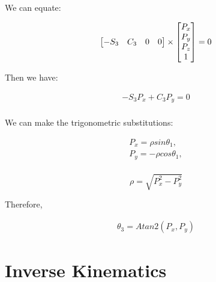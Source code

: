 \documentclass[transmag]{IEEEtran}
\begin{document}
We can equate:

\begin{equation}
\begin{bmatrix}
-S_3  & C_3   & 0 & 0   \\
\end{bmatrix}
\times
\begin{bmatrix}
P_x \\
P_y \\
P_z \\
1
\end{bmatrix}
= 0 \\
\end{equation}

Then we have:

\begin{equation}
\begin{matrix}
-S_3 P_x + C_3 P_y = 0 \\

\end{matrix}
\end{equation}

We can make the trigonometric substitutions:

\begin{equation}
\begin{matrix}
P_x = \rho sin \theta_1, \\
P_y = -\rho cos \theta_1, \\
\end{matrix}
\end{equation}

\begin{equation}
\rho = \sqrt{P_x^2 - P_y^2} 
\end{equation}


Therefore,



\begin{equation}
\begin{matrix}
\theta_3 = Atan2(P_x, P_y)
\end{matrix}
\label{2-3}
\end{equation}














\clearpage
\newpage





\section{Inverse Kinematics}
\end{document}
